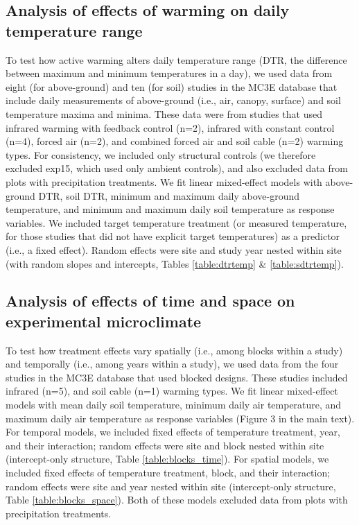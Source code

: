 \documentclass{article}
\begin{document}
\subsection* {Analysis of effects of warming on daily temperature range}
To test how active warming alters daily temperature range (DTR, the difference between maximum and minimum temperatures in a day), we used data from eight (for above-ground) and ten (for soil) studies in the MC3E database that include daily measurements of above-ground (i.e., air, canopy, surface) and soil temperature maxima and minima. These data were from studies that used infrared warming with feedback control (n=2), infrared with constant control (n=4), forced air (n=2), and combined forced air and soil cable (n=2) warming types.  For consistency, we included only structural controls (we therefore excluded exp15, which used only ambient controls), and also excluded data from plots with precipitation treatments. We fit linear mixed-effect models with above-ground DTR, soil DTR, minimum and maximum daily above-ground temperature, and minimum and maximum daily soil temperature as response variables. We included target temperature treatment (or measured temperature, for those studies that did not have explicit target temperatures) as a predictor (i.e., a fixed effect). Random effects were site and study year nested within site (with random slopes and intercepts, Tables \ref{table:dtrtemp} \& \ref{table:sdtrtemp}). 

\subsection* {Analysis of effects of time and space on experimental microclimate}
To test how treatment effects vary spatially (i.e., among blocks within a study) and temporally (i.e., among years within a study), we used data from the four studies in the MC3E database that used blocked designs. These studies included infrared (n=5), and soil cable (n=1) warming types.  We fit linear mixed-effect models with mean daily soil temperature, minimum daily air temperature, and maximum daily air temperature as response variables (Figure 3 in the main text). For temporal models, we included fixed effects of temperature treatment, year, and their interaction; random effects were site and block nested within site (intercept-only structure, Table \ref{table:blocks_time}). For spatial models, we included fixed effects of temperature treatment, block, and their interaction; random effects were site and year nested within site (intercept-only structure, Table \ref{table:blocks_space}). Both of these models excluded data from plots with precipitation treatments. 
\end{document}

